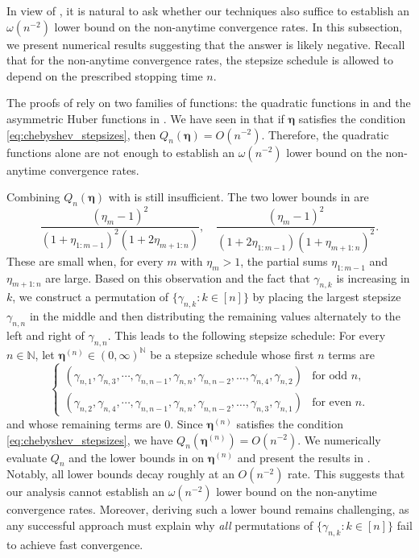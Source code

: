 \documentclass[11pt]{article}
\newcommand{\N}{\mathbb{N}}
\newcommand{\schedule}{\bm{\eta}}
\begin{document}
In view of , it is natural to ask whether our techniques also suffice to establish an $\omega(n^{-2})$ lower bound on the non-anytime convergence rates.
In this subsection, we present numerical results suggesting that the answer is likely negative.
Recall that for the non-anytime convergence rates, the stepsize schedule is allowed to depend on the prescribed stopping time $n$.

The proofs of  rely on two families of functions:
the quadratic functions in  and the asymmetric Huber functions in .
We have seen in  that if $\schedule$ satisfies the condition \eqref{eq:chebyshev_stepsizes}, then $Q_n(\schedule) = O(n^{-2})$.
Therefore, the quadratic functions alone are not enough to establish an $\omega(n^{-2})$ lower bound on the non-anytime convergence rates.

Combining $Q_n(\schedule)$ with  is still insufficient.
The two lower bounds in  are
\[
	\frac{ (\eta_m-1)^2 }{ ( 1 + \eta_{1:m-1} )^2 ( 1 + 2 \eta_{m+1:n} ) },\quad \frac{ (\eta_m-1)^2 }{ ( 1 + 2 \eta_{1:m-1} ) ( 1 + \eta_{m+1:n} )^2 }.
\]
These are small when, for every $m$ with $\eta_m>1$, the partial sums $\eta_{1:m-1}$ and $\eta_{m+1:n}$ are large.
Based on this observation and the fact that $\gamma_{n,k}$ is increasing in $k$, we construct a permutation of $\{ \gamma_{n,k} : k\in[n] \}$ by placing the largest stepsize $\gamma_{n,n}$ in the middle and then distributing the remaining values alternately to the left and right of $\gamma_{n,n}$.
This leads to the following stepsize schedule:
For every $n\in\N$, let $\schedule^{(n)}\in(0,\infty)^{\N}$ be a stepsize schedule whose first $n$ terms are
\begin{equation}\label{eq:permutation}
	\begin{cases}
		\left(\gamma_{n,1}, \gamma_{n,3}, \cdots, \gamma_{n,n-1}, \gamma_{n,n}, \gamma_{n,n-2}, \ldots, \gamma_{n,4}, \gamma_{n,2} \right) &\text{for odd }n, \\
		\left(\gamma_{n,2}, \gamma_{n,4}, \cdots, \gamma_{n,n-1}, \gamma_{n,n}, \gamma_{n,n-2}, \ldots, \gamma_{n,3}, \gamma_{n,1} \right) &\text{for even }n.
	\end{cases}
\end{equation}
and whose remaining terms are $0$.
Since $\schedule^{(n)}$ satisfies the condition \eqref{eq:chebyshev_stepsizes}, we have  $Q_n(\schedule^{(n)}) = O(n^{-2})$.
We numerically evaluate $Q_n$ and the lower bounds in  on $\schedule^{(n)}$ and present the results in .
Notably, all lower bounds decay roughly at an $O(n^{-2})$ rate.
This suggests that our analysis cannot establish an $\omega(n^{-2})$ lower bound on the non-anytime convergence rates.
Moreover, deriving such a lower bound remains challenging, as any successful approach must explain why \emph{all} permutations of $\{ \gamma_{n,k} : k\in[n] \}$ fail to achieve fast convergence.
\end{document}
